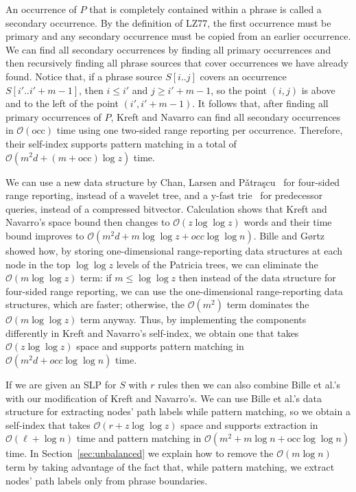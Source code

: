 \documentclass[review]{elsarticle}
\newcommand{\Oh}[1]
    {\ensuremath{\mathcal{O}\!\left( {#1} \right)}}
\newcommand{\occ}
    {\ensuremath{\mathrm{occ}}}
\begin{document}
An occurrence of $P$ that is completely contained within a phrase is called a secondary occurrence.  By the definition of LZ77, the first occurrence must be primary and any secondary occurrence must be copied from an earlier occurrence.  We can find all secondary occurrences by finding all primary occurrences and then recursively finding all phrase sources that cover occurrences we have already found.  Notice that, if a phrase source \(S [i..j]\) covers an occurrence \(S [i'..i' + m - 1]\), then \(i \leq i'\) and \(j \geq i' + m - 1\), so the point \((i, j)\) is above and to the left of the point \((i', i' + m - 1)\).  It follows that, after finding all primary occurrences of $P$, Kreft and Navarro can find all secondary occurrences in $\Oh{\occ}$ time using one two-sided range reporting per occurrence.  Therefore, their self-index supports pattern matching in a total of $\Oh{m^2 d + (m + \occ) \log z}$ time.

We can use a new data structure by Chan, Larsen and P\v{a}tra\c{s}cu~\cite{CLP11} for four-sided range reporting, instead of a wavelet tree, and a y-fast trie~\cite{Wil83} for predecessor queries, instead of a compressed bitvector.  Calculation shows that Kreft and Navarro's space bound then changes to $\Oh{z \log \log z}$ words and their time bound improves to $\Oh{m^2 d + m \log \log z + occ \log \log n}$.  Bille and G{\o}rtz~\cite{BG11} showed how, by storing one-dimensional range-reporting data structures at each node in the top \(\log \log z\) levels of the Patricia trees, we can eliminate the $\Oh{m \log \log z}$ term: if \(m \leq \log \log z\) then instead of the data structure for four-sided range reporting, we can use the one-dimensional range-reporting data structures, which are faster; otherwise, the $\Oh{m^2}$ term dominates the $\Oh{m \log \log z}$ term anyway.  Thus, by implementing the components differently in Kreft and Navarro's self-index, we obtain one that takes $\Oh{z \log \log z}$ space and supports pattern matching in $\Oh{m^2 d + occ \log \log n}$ time.

If we are given an SLP for $S$ with $r$ rules then we can also combine Bille et al.'s~\cite{BLRSSW11} with our modification of Kreft and Navarro's.  We can use Bille et al.'s data structure for extracting nodes' path labels while pattern matching, so we obtain a self-index that takes $\Oh{r + z \log \log z}$ space and supports extraction in $\Oh{\ell + \log n}$ time and pattern matching in $\Oh{m^2 + m \log n + \occ \log \log n}$ time.  In Section~\ref{sec:unbalanced} we explain how to remove the $\Oh{m \log n}$ term by taking advantage of the fact that, while pattern matching, we extract nodes' path labels only from phrase boundaries.
\end{document}
